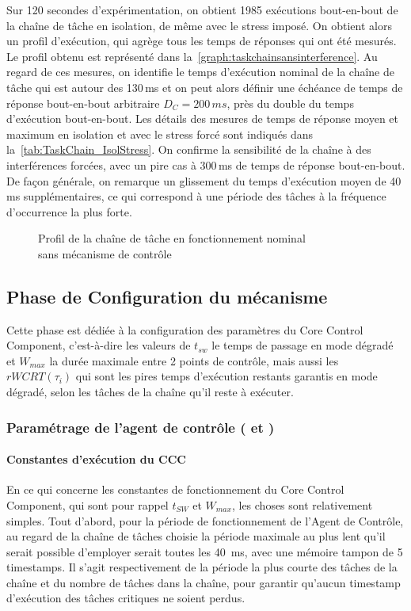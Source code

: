 \documentclass[french, a4paper, 11pt, twoside, pdftex]{StyleThese}
\begin{document}
Sur 120 secondes d'expérimentation, on obtient 1985 exécutions bout-en-bout de la chaîne de tâche en isolation, de même avec le stress imposé. On obtient alors un profil d'exécution, qui agrège tous les temps de réponses qui ont été mesurés. Le profil obtenu est représenté dans la~\autoref{graph:taskchainsansinterference}. Au regard de ces mesures, on identifie le temps d'exécution nominal de la chaîne de tâche qui est autour des 130\,ms et on peut alors définir une échéance de temps de réponse bout-en-bout arbitraire $D_C = 200\,ms$, près du double du temps d'exécution bout-en-bout. Les détails des mesures de temps de réponse moyen et maximum en isolation et avec le stress forcé sont indiqués dans la~\autoref{tab:TaskChain_IsolStress}. On confirme la sensibilité de la chaîne à des interférences forcées, avec un pire cas à 300\,ms de temps de réponse bout-en-bout. De façon générale, on remarque un glissement du temps d'exécution moyen de 40\,ms supplémentaires, ce qui correspond à une période des tâches à la fréquence d’occurrence la plus forte.

\begin{figure}[ht]
	\centering
	\scalebox{0.9}{}
	\captionsetup{justification=centering}
	\caption{Profil de la chaîne de tâche en fonctionnement nominal \\ sans mécanisme de contrôle}
	\label{graph:taskchainsansinterference}
\end{figure}

\subsection{Phase de Configuration du mécanisme}

Cette phase est dédiée à la configuration des paramètres du Core Control Component, c'est-à-dire les valeurs de $t_{sw}$ le temps de passage en mode dégradé et $W_{max}$ la durée maximale entre 2 points de contrôle, mais aussi les $rWCRT(\tau_i)$ qui sont les pires temps d'exécution restants garantis en mode dégradé, selon les tâches de la chaîne qu'il reste à exécuter.

\subsubsection{Paramétrage de l'agent de contrôle ( et )}

\paragraph{Constantes d'exécution du CCC}
En ce qui concerne les constantes de fonctionnement du Core Control Component, qui sont pour rappel $t_{SW}$ et $W_{max}$, les choses sont relativement simples. Tout d'abord, pour la période de fonctionnement de l'Agent de Contrôle, au regard de la chaîne de tâches choisie la période maximale au plus lent qu'il serait possible d'employer serait toutes les 40~ms, avec une mémoire tampon de 5 timestamps. Il s'agit respectivement de la période la plus courte des tâches de la chaîne et du nombre de tâches dans la chaîne, pour garantir qu'aucun timestamp d'exécution des tâches critiques ne soient perdus.
\end{document}
